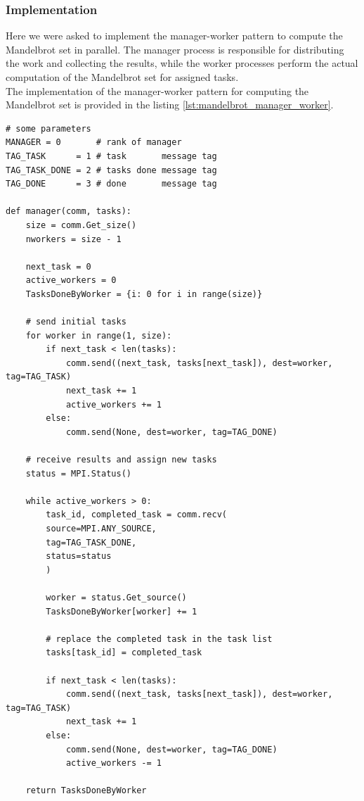 \documentclass[unicode,10pt,a4paper,oneside,numbers=endperiod,openany]{scrartcl}
\begin{document}
\subsubsection{Implementation}
Here we were asked to implement the manager-worker pattern to compute the Mandelbrot set in parallel. The manager process is responsible for distributing the work and collecting the results, while the worker processes perform the actual computation of the Mandelbrot set for assigned tasks.\\
The implementation of the manager-worker pattern for computing the Mandelbrot set is provided in the listing \ref{lst:mandelbrot_manager_worker}.
\begin{lstlisting}[style=grayverbatim,label={lst:mandelbrot_manager_worker},caption={Manager-worker pattern for computing the Mandelbrot set in parallel}]
# some parameters
MANAGER = 0       # rank of manager
TAG_TASK      = 1 # task       message tag
TAG_TASK_DONE = 2 # tasks done message tag
TAG_DONE      = 3 # done       message tag

def manager(comm, tasks):
    size = comm.Get_size()
    nworkers = size - 1

    next_task = 0
    active_workers = 0
    TasksDoneByWorker = {i: 0 for i in range(size)}

    # send initial tasks
    for worker in range(1, size):
        if next_task < len(tasks):
            comm.send((next_task, tasks[next_task]), dest=worker, tag=TAG_TASK)
            next_task += 1
            active_workers += 1
        else:
            comm.send(None, dest=worker, tag=TAG_DONE)

    # receive results and assign new tasks
    status = MPI.Status()

    while active_workers > 0:
        task_id, completed_task = comm.recv(
        source=MPI.ANY_SOURCE,
        tag=TAG_TASK_DONE,
        status=status
        )

        worker = status.Get_source()
        TasksDoneByWorker[worker] += 1

        # replace the completed task in the task list
        tasks[task_id] = completed_task

        if next_task < len(tasks):
            comm.send((next_task, tasks[next_task]), dest=worker, tag=TAG_TASK)
            next_task += 1
        else:
            comm.send(None, dest=worker, tag=TAG_DONE)
            active_workers -= 1

    return TasksDoneByWorker



\end{lstlisting}
\end{document}
